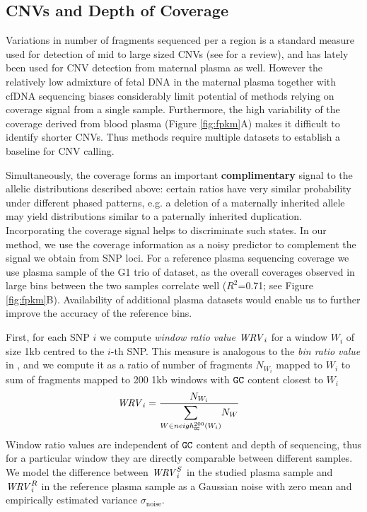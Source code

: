 \subsection{CNVs and Depth of Coverage}\label{ss:coverage}
Variations in number of fragments sequenced per a region is a standard measure used for detection of mid to large sized CNVs (see \cite{medvedev2009} for a review), and has lately been used for CNV detection from maternal plasma \cite{srinivasan2013, chen2013} as well. However the relatively low admixture of fetal DNA in the maternal plasma together with cfDNA sequencing biases considerably limit potential of methods relying on coverage signal from a single sample. Furthermore, the high variability of the coverage derived from blood plasma (Figure \ref{fig:fpkm}A) makes it difficult to identify shorter CNVs. Thus methods \cite{srinivasan2013, chen2013} require multiple datasets to establish a baseline for CNV calling.

Simultaneously, the coverage forms an important \textbf{complimentary} signal to the allelic distributions described above: certain ratios have very similar probability under different phased patterns, e.g. a deletion of a maternally inherited allele may yield distributions similar to a paternally inherited duplication. Incorporating the coverage signal helps to discriminate such states. In our method, we use the coverage information as a noisy predictor to complement the signal we obtain from SNP loci. For a reference plasma sequencing coverage we use plasma sample of the G1 trio of \cite{kitzman2012} dataset, as the overall coverages observed in large bins between the two samples correlate well ($R^2$=0.71; see Figure \ref{fig:fpkm}B). Availability of additional plasma datasets would enable us to further improve the accuracy of the reference bins.

First, for each SNP $i$ we compute \emph{window ratio value} $\mathit{WRV}_i$ for a window $W_i$ of size 1kb centred to the $i$-th SNP. This measure is analogous to the \emph{bin ratio value} in \cite{srinivasan2013}, and we compute it as a ratio of number of fragments $N_{W_i}$ mapped to $W_i$ to sum of fragments mapped to 200 1kb windows with $\texttt{G}\texttt{C}$ content closest to $W_i$
\begin{align}
\WRV_i &= \frac{ N_{W_i} }{ \mathlarger{\sum_{W \in neigh_{\G\C}^{200}(W_i)}} N_{W} }
\end{align}
Window ratio values are independent of $\texttt{G}\texttt{C}$ content and depth of sequencing, thus for a particular window they are directly comparable between different samples. We model the difference between $\mathit{WRV}_i^S$ in the studied plasma sample and $\mathit{WRV}_i^R$ in the reference plasma sample as a Gaussian noise with zero mean and empirically estimated variance $\sigma_{\text{noise}}$. 

